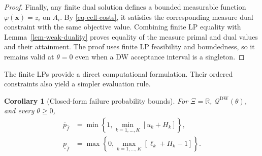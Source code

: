 \documentclass[review,11pt,3p,authoryear,nopreprintline]{elsarticle}
\newtheorem{corollary}{Corollary}
\begin{document}
\begin{proof}
  Finally, any finite dual solution defines a bounded measurable function $\varphi(\bm x)=z_i$ on $A_i$. By \eqref{eq-cell-costs}, it satisfies the corresponding measure dual constraint with the same objective value. Combining finite LP equality with Lemma~\ref{lem-weak-duality} proves equality of the measure primal and dual values and their attainment. The proof uses finite LP feasibility and boundedness, so it remains valid at $\theta=0$ even when a DW acceptance interval is a singleton.
\end{proof}

The finite LPs provide a direct computational formulation. Their ordered constraints also yield a simpler evaluation rule.

\begin{corollary}[Closed-form failure probability bounds]
  \label{thm-closed-form-bounds}
  For $\Xi=\mathbb R$, $\mathscr Q^{\mathrm{DW}}(\theta)$, and every $\theta\ge0$,
  \begin{align}
    \overline p_{\hat f}
    &=\min\left\{1,\min_{k=1,\ldots,K}\left[u_k+H_k\right]\right\},
    \label{eq-dw-closed-upper}\\
    \underline p_{\hat f}
    &=\max\left\{0,\max_{k=1,\ldots,K}\left[\ell_k+H_k-1\right]\right\}.
    \label{eq-dw-closed-lower}
  \end{align}
\end{corollary}
\end{document}
